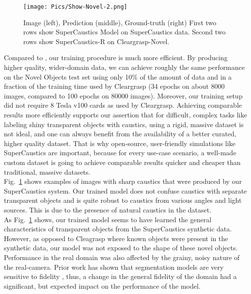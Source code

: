 \documentclass[conference]{IEEEtran}
\begin{document}
  \begin{figure}
    \center
    \texttt{[image: Pics/Show-Novel-2.png]}
    \caption{Image (left), Prediction (middle), Ground-truth (right) First two rows show SuperCaustics Model on SuperCaustics data. Second two rows show SuperCaustics-R on Cleargrasp-Novel.}\label{show-novel}
  \end{figure}
  
 Compared to \cite{cleargrasp}, our training procedure is much more efficient. By producing higher quality, wider-domain data, we can achieve roughly the same performance on the Novel Objects test set using only 10\% of the amount of data and in a fraction of the training time used by Cleargrasp (34 epochs on about 8000 images, compared to 100 epochs on 80000 images). Moreover, our training setup did not require 8 Tesla v100 cards as used by Cleargrasp. Achieving comparable results more efficiently supports our assertion that for difficult, complex tasks like labeling shiny transparent objects with caustics, using a rigid, massive dataset is not ideal, and one can always benefit from the availability of a better curated, higher quality dataset. That is why open-source, user-friendly simulations like SuperCaustics are important, because for every use-case scenario, a well-made custom dataset is going to achieve comparable results quicker and cheaper than traditional, massive datasets.\\





 Fig.~\ref{show-novel} shows examples of images with sharp caustics that were produced by our SuperCaustics system. Our trained model does not confuse caustics with separate transparent objects and is quite robust to caustics from various angles and light sources. This is due to the presence of natural caustics in the dataset.\\

 As Fig.~\ref{show-novel} shows, our trained model seems to have learned the general characteristics of transparent objects from the SuperCaustics synthetic data. However, as opposed to Cleagrasp where known objects were present in the synthetic data, our model was not exposed to the shape of these novel objects. Performance in the real domain was also affected by the grainy, noisy nature of the real-camera. Prior work has shown that segmentation models are very sensitive to fidelity \cite{AIP}, thus, a change in the general fidelity of the domain had a significant, but expected impact on the performance of the model.\\
\end{document}
